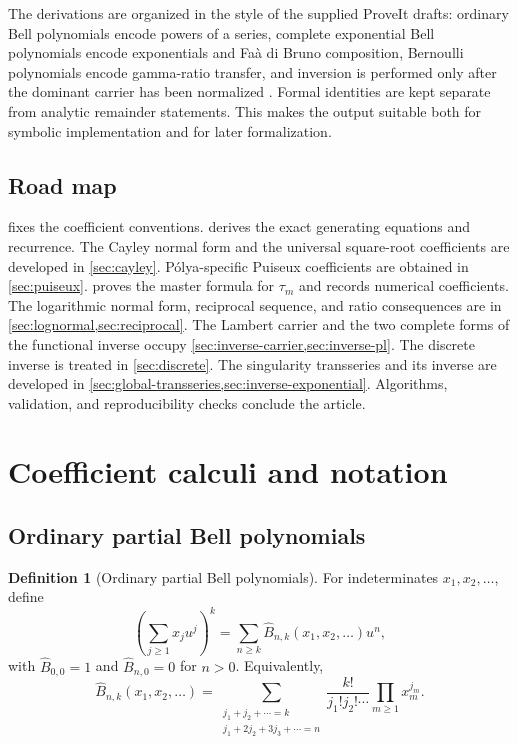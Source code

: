 \documentclass[11pt,oneside]{article}
\numberwithin{equation}{section}
\theoremstyle{plain}
\theoremstyle{definition}
\newtheorem{definition}[theorem]{Definition}
\theoremstyle{remark}
\newcommand{\Bhat}{\widehat{B}}
\begin{document}
The derivations are organized in the style of the supplied ProveIt drafts:
ordinary Bell polynomials encode powers of a series, complete exponential
Bell polynomials encode exponentials and Fa\`a di Bruno composition,
Bernoulli polynomials encode gamma-ratio transfer, and inversion is performed
only after the dominant carrier has been normalized
\cite{Comtet1974,ProveItCoefficientCalculus,ProveItTransseries}.  Formal identities are
kept separate from analytic remainder statements.  This makes the output
suitable both for symbolic implementation and for later formalization.

\subsection{Road map}

 fixes the coefficient conventions.  
derives the exact generating equations and recurrence.  The Cayley normal
form and the universal square-root coefficients are developed in
\cref{sec:cayley}.  P\'olya-specific Puiseux coefficients are obtained in
\cref{sec:puiseux}.   proves the master formula for
$\tau_m$ and records numerical coefficients.  The logarithmic normal form,
reciprocal sequence, and ratio consequences are in
\cref{sec:lognormal,sec:reciprocal}.  The Lambert carrier and the two complete
forms of the functional inverse occupy \cref{sec:inverse-carrier,sec:inverse-pl}.
The discrete inverse is treated in \cref{sec:discrete}.  The singularity
transseries and its inverse are developed in
\cref{sec:global-transseries,sec:inverse-exponential}.  Algorithms,
validation, and reproducibility checks conclude the article.

\section{Coefficient calculi and notation}\label{sec:bell}

\subsection{Ordinary partial Bell polynomials}

\begin{definition}[Ordinary partial Bell polynomials]
For indeterminates $x_1,x_2,\ldots$, define
\[
 \left(\sum_{j\ge1}x_j u^j\right)^k
   =\sum_{n\ge k}\Bhat_{n,k}(x_1,x_2,\ldots)u^n,
\]
with $\Bhat_{0,0}=1$ and $\Bhat_{n,0}=0$ for $n>0$.  Equivalently,
\begin{equation}\label{eq:ordinary-bell-definition}
 \Bhat_{n,k}(x_1,x_2,\ldots)
 =\sum_{\substack{j_1+j_2+\cdots=k\\
                   j_1+2j_2+3j_3+\cdots=n}}
   \frac{k!}{j_1!j_2!\cdots}\prod_{m\ge1}x_m^{j_m}.
\end{equation}
\end{definition}
\end{document}
